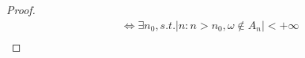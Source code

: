 \documentclass[12pt, a4paper, oneside]{ctexart}
\begin{document}
\begin{proof}
$$\begin{aligned}
                                                                                                                                                                                                                                                                                                                                                                                                                                                                                                                                                                                                                                                                                                                                                                                                                                                                                                                                                                                                                                                                                                                                                                                                                                                                                                                                                                                                                                                                                                                                                                        & \Leftrightarrow  \exists n_0, s.t. |{n: n > n_0, \omega\notin A_n}| < +\infty \\

\end{aligned}$$
\end{proof}
\end{document}
